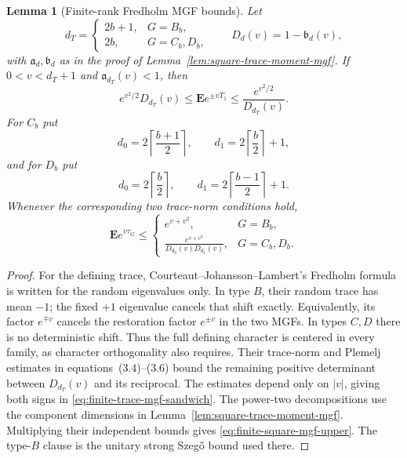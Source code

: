 \documentclass[11pt,reqno]{amsart}
\theoremstyle{plain}
\newtheorem{lemma}[theorem]{Lemma}
\theoremstyle{definition}
\begin{document}
\begin{lemma}[Finite-rank Fredholm MGF bounds]
\label{lem:finite-rank-fredholm-mgf}
Let
\[
 d_T=\begin{cases}2b+1,&G=B_b,\\2b,&G=C_b,D_b,
 \end{cases}
 \qquad D_d(v)=1-\mathfrak b_d(v),
\]
with $\mathfrak a_d,\mathfrak b_d$ as in the proof of
Lemma~\ref{lem:square-trace-moment-mgf}.  If
$0<v<d_T+1$ and $\mathfrak a_{d_T}(v)<1$, then
\begin{equation}
\label{eq:finite-trace-mgf-sandwich}
 e^{v^2/2}D_{d_T}(v)
 \leq\mathbf E e^{\pm vT_1}
 \leq\frac{e^{v^2/2}}{D_{d_T}(v)}.
\end{equation}
For $C_b$ put
\[
 d_0=2\left\lceil\frac{b+1}{2}\right\rceil,
 \qquad d_1=2\left\lceil\frac b2\right\rceil+1,
\]
and for $D_b$ put
\[
 d_0=2\left\lceil\frac b2\right\rceil,
 \qquad d_1=2\left\lceil\frac{b-1}{2}\right\rceil+1.
\]
Whenever the corresponding two trace-norm conditions hold,
\begin{equation}
\label{eq:finite-square-mgf-upper}
 \mathbf E e^{v\tau_G}\leq
 \begin{cases}
 e^{v+v^2},&G=B_b,\\[2pt]
 \displaystyle\frac{e^{v+v^2}}{D_{d_0}(v)D_{d_1}(v)},
   &G=C_b,D_b.
 \end{cases}
\end{equation}
\end{lemma}

\begin{proof}
For the defining trace, Courteaut--Johansson--Lambert's Fredholm formula
\cite[Proposition~3.3 and the paragraph following it]{CJL2022} is written for
the random eigenvalues only.  In type $B$, their random trace has mean $-1$;
the fixed $+1$ eigenvalue cancels that shift exactly.  Equivalently, its
factor $e^{\mp v}$ cancels the restoration factor $e^{\pm v}$ in the two
MGFs.  In types $C,D$ there is no deterministic shift.  Thus the full
defining character is centered in every family, as character orthogonality
also requires.  Their trace-norm and
Plemelj estimates in equations~(3.4)--(3.6) bound the remaining positive
determinant between $D_{d_T}(v)$ and its reciprocal.  The estimates depend
only on $|v|$, giving both signs in
\eqref{eq:finite-trace-mgf-sandwich}.  The power-two decompositions use the
component dimensions in Lemma~\ref{lem:square-trace-moment-mgf}.
Multiplying their independent bounds gives
\eqref{eq:finite-square-mgf-upper}.  The type-$B$ clause is the unitary
strong Szeg\H{o} bound used there.
\end{proof}
\end{document}
